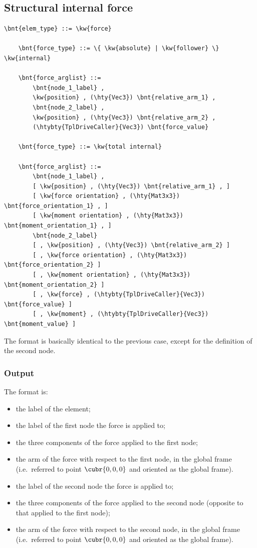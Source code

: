 \subsection{Structural internal force}
\label{sec:EL:FORCE:STRUCTURAL:INTERNAL_FORCE}
\begin{Verbatim}[commandchars=\\\{\}]
    \bnt{elem_type} ::= \kw{force}

    \bnt{force_type} ::= \{ \kw{absolute} | \kw{follower} \} \kw{internal}

    \bnt{force_arglist} ::=
        \bnt{node_1_label} , 
        \kw{position} , (\hty{Vec3}) \bnt{relative_arm_1} ,
        \bnt{node_2_label} ,
        \kw{position} , (\hty{Vec3}) \bnt{relative_arm_2} ,
        (\htybty{TplDriveCaller}{Vec3}) \bnt{force_value}

    \bnt{force_type} ::= \kw{total internal}

    \bnt{force_arglist} ::=
        \bnt{node_1_label} ,
        [ \kw{position} , (\hty{Vec3}) \bnt{relative_arm_1} , ]
        [ \kw{force orientation} , (\hty{Mat3x3}) \bnt{force_orientation_1} , ]
        [ \kw{moment orientation} , (\hty{Mat3x3}) \bnt{moment_orientation_1} , ]
        \bnt{node_2_label}
        [ , \kw{position} , (\hty{Vec3}) \bnt{relative_arm_2} ]
        [ , \kw{force orientation} , (\hty{Mat3x3}) \bnt{force_orientation_2} ]
        [ , \kw{moment orientation} , (\hty{Mat3x3}) \bnt{moment_orientation_2} ]
        [ , \kw{force} , (\htybty{TplDriveCaller}{Vec3}) \bnt{force_value} ]
        [ , \kw{moment} , (\htybty{TplDriveCaller}{Vec3}) \bnt{moment_value} ]
\end{Verbatim}
The format is basically identical to the previous case,
except for the definition of the second node.

\subsubsection{Output}
The format is:
\begin{itemize}
    \item the label of the element;
    \item the label of the first node the force is applied to;
    \item the three components of the force applied to the first node;
    \item the arm of the force with respect to the first node,
	  in the global frame (i.e.\ referred to point $ \cubr{0,0,0} $
	  and oriented as the global frame).
    \item the label of the second node the force is applied to;
    \item the three components of the force applied to the second node
	  (opposite to that applied to the first node);
    \item the arm of the force with respect to the second node,
	  in the global frame (i.e.\ referred to point $ \cubr{0,0,0} $
	  and oriented as the global frame).
\end{itemize}

